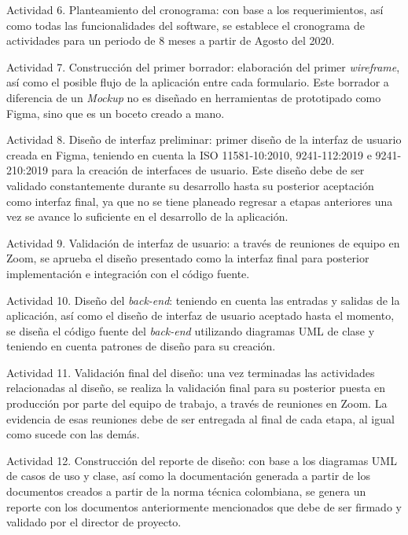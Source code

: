 \begin{APAitemize}
    \item Actividad 6. Planteamiento del cronograma: con base a los requerimientos, así como todas las funcionalidades del software, se establece el cronograma de actividades para un periodo de 8 meses a partir de Agosto del 2020.
    \item Actividad 7. Construcción del primer borrador: elaboración del primer \textit{wireframe}, así como el posible flujo de la aplicación entre cada formulario. Este borrador a diferencia de un \textit{Mockup} no es diseñado en herramientas de prototipado como Figma, sino que es un boceto creado a mano.
    \item Actividad 8. Diseño de interfaz preliminar: primer diseño de la interfaz de usuario creada en Figma, teniendo en cuenta la ISO 11581-10:2010, 9241-112:2019 e 9241-210:2019 para la creación de interfaces de usuario. Este diseño debe de ser validado constantemente durante su desarrollo hasta su posterior aceptación como interfaz final, ya que no se tiene planeado regresar a etapas anteriores una vez se avance lo suficiente en el desarrollo de la aplicación.
    \item Actividad 9. Validación de interfaz de usuario: a través de reuniones de equipo en Zoom, se aprueba el diseño presentado como la interfaz final para posterior implementación e integración con el código fuente.
    \item Actividad 10. Diseño del \textit{back-end}: teniendo en cuenta las entradas y salidas de la aplicación, así como el diseño de interfaz de usuario aceptado hasta el momento, se diseña el código fuente del \textit{back-end} utilizando diagramas UML de clase y teniendo en cuenta patrones de diseño para su creación.
    \item Actividad 11. Validación final del diseño: una vez terminadas las actividades relacionadas al diseño, se realiza la validación final para su posterior puesta en producción por parte del equipo de trabajo, a través de reuniones en Zoom. La evidencia de esas reuniones debe de ser entregada al final de cada etapa, al igual como sucede con las demás.
    \item Actividad 12. Construcción del reporte de diseño: con base a los diagramas UML de casos de uso y clase, así como la documentación generada a partir de los documentos creados a partir de la norma técnica colombiana, se genera un reporte con los documentos anteriormente mencionados que debe de ser firmado y validado por el director de proyecto.
\end{APAitemize}

